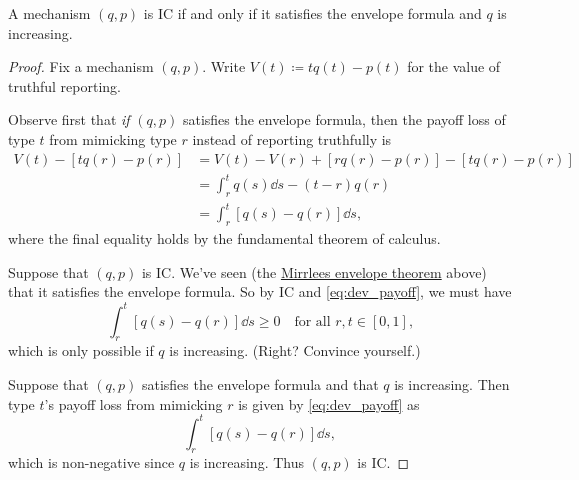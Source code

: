 \begin{namedthm}
	\label{proposition:SM_lemma}
	A mechanism $(q,p)$ is IC if and only if
	it satisfies the envelope formula
	and $q$ is increasing.
\end{namedthm}

\begin{proof}
	Fix a mechanism $(q,p)$.
	Write $V(t) \coloneqq t q(t) - p(t)$ for the value of truthful reporting.

	Observe first that \emph{if} $(q,p)$ satisfies the envelope formula, then the payoff loss of type $t$ from mimicking type $r$ instead of reporting truthfully is
	\begin{align}
		V(t) - [ t q(r) - p(r) ]
		&= V(t) - V(r)
		+ [ r q(r) - p(r) ]
		- [ t q(r) - p(r) ]
		\nonumber
		\\
		&= \int_r^t q(s) \dd s
		- (t-r) q(r)
		\nonumber
		\\
		&= \int_r^t \left[ q(s) - q(r) \right] \dd s ,
		\label{eq:dev_payoff}
		\tag{$\star$}
	\end{align}
	where the final equality holds by the fundamental theorem of calculus.

	Suppose that $(q,p)$ is IC.
	We've seen (the \hyperref[proposition:ic_env]{Mirrlees envelope theorem} above) that it satisfies the envelope formula.
	So by IC and \eqref{eq:dev_payoff}, we must have 
	\begin{equation*}
		\int_r^t \left[ q(s) - q(r) \right] \dd s \geq 0
		\quad \text{for all $r,t \in [0,1]$,}
	\end{equation*}
	which is only possible if $q$ is increasing.
	(Right? Convince yourself.)

	Suppose that $(q,p)$ satisfies the envelope formula and that $q$ is increasing.
	Then type $t$'s payoff loss from mimicking $r$ is given by \eqref{eq:dev_payoff} as
	\begin{equation*}
		\int_r^t \left[ q(s) - q(r) \right] \dd s ,
	\end{equation*}
	which is non-negative since $q$ is increasing.
	Thus $(q,p)$ is IC.
\end{proof}


